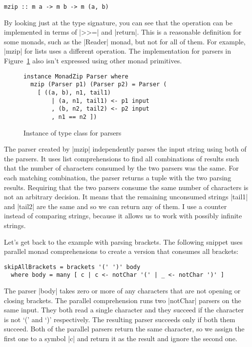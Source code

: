 \documentclass{tmr}
\begin{document}
\begin{verbatim}
mzip :: m a -> m b -> m (a, b)
\end{verbatim}
By looking just at the type signature, you can see that the operation can be implemented in terms
of |>>=| and |return|. This is a reasonable definition for some monads, such as the |Reader| monad,
but not for all of them. For example, |mzip| for lists uses a different operation. 
The implementation for parsers in Figure~\ref{fig:monadzip-instance} also isn't expressed using
other monad primitives.

\begin{figure}
\begin{verbatim}
instance MonadZip Parser where 
  mzip (Parser p1) (Parser p2) = Parser ( 
    [ ((a, b), n1, tail1) 
        | (a, n1, tail1) <- p1 input
        , (b, n2, tail2) <- p2 input
        , n1 == n2 ])
\end{verbatim}
\caption{Instance of  type class for parsers}
\label{fig:monadzip-instance}
\end{figure}

The parser created by |mzip| independently parses the input string using both of the parsers.
It uses list comprehensions to find all combinations of results such that the number of 
characters consumed by the two parsers was the same. For each matching combination, the parser 
returns a tuple with the two parsing results. Requiring that the two parsers consume the same 
number of characters is not an arbitrary decision. It means that the remaining unconsumed strings 
|tail1| and |tail2| are the same and so we can return any of them. I use a counter instead of 
comparing strings, because it allows us to work with possibly infinite
strings. 

Let's get back to the example with parsing brackets. The following snippet uses parallel 
monad comprehensions to create a version that consumes all brackets:

\begin{verbatim}
skipAllBrackets = brackets '(' ')' body
  where body = many [ c | c <- notChar '(' | _ <- notChar ')' ]
\end{verbatim}
The parser |body| takes zero or more of any characters that are not opening or closing brackets.
The parallel comprehension runs two |notChar| parsers on the same input. They both read a single
character and they succeed if the character is not `(' and `)' respectively. The resulting parser
succeeds only if both them succeed. Both of the parallel parsers return the same character, so we
assign the first one to a symbol |c| and return it as the result and ignore the second one.
\end{document}
